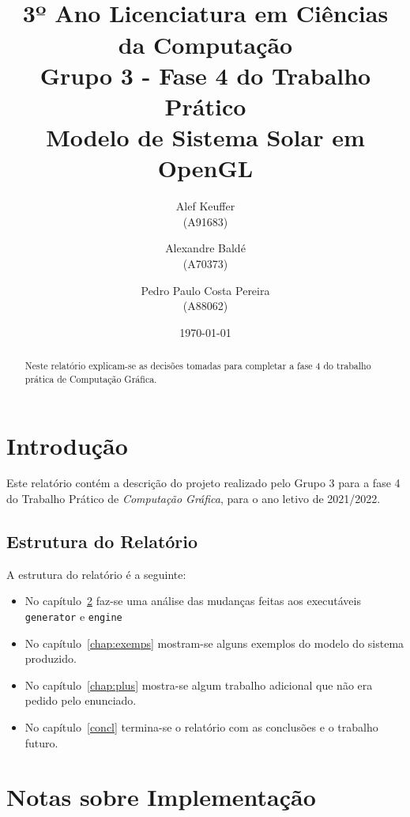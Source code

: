 \documentclass[11pt,a4paper]{report}%
\title{\cg \\
      3º Ano Licenciatura em Ciências da Computação \\
      \textbf{Grupo 3 - Fase 4 do Trabalho Prático}\\ Modelo de Sistema Solar em OpenGL
      } %
\author{Alef Keuffer\\ (A91683) \and Alexandre Baldé\\ (A70373)
         \and Pedro Paulo Costa Pereira \\ (A88062)
       } %
\date{\today} %
\def\cg{\emph{Computação Gráfica}\xspace}
\begin{document}
\maketitle %

\begin{abstract}  %
Neste relatório explicam-se as decisões tomadas para completar a fase 4 do trabalho prática
de Computação Gráfica.
\end{abstract}

\tableofcontents %
\listoffigures %

\chapter{Introdução} \label{chap:intro} %

Este relatório contém a descrição do projeto realizado pelo Grupo 3 para
a fase 4 do Trabalho Prático de \cg, para o ano letivo de 2021/2022.

\section*{Estrutura do Relatório}

A estrutura do relatório é a seguinte:
\begin{itemize}
\item No capítulo~\ref{chap:notas} faz-se uma análise das mudanças feitas aos
  executáveis \texttt{generator} e \texttt{engine}
  
\item No capítulo~\ref{chap:exemps} mostram-se alguns exemplos do modelo do sistema
  produzido.

\item No capítulo~\ref{chap:plus} mostra-se algum trabalho adicional que não era pedido pelo
  enunciado.

\item No capítulo~\ref{concl} termina-se o relatório com as conclusões e o trabalho futuro.
\end{itemize}

\chapter{Notas sobre Implementação} \label{chap:notas} %
\end{document}
